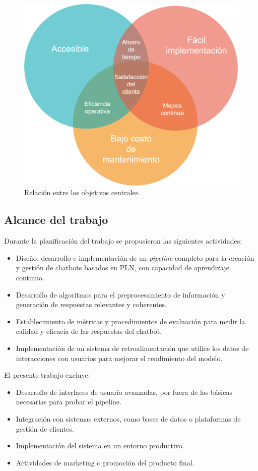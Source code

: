 \begin{figure}[htbp]

  \centering
  \includegraphics[width=.75\textwidth]{./Figures/Venn_objetivos.png}
  \caption{Relación entre los objetivos centrales.}
  \label{fig:objetivos_venn}
\end{figure}

\subsection{Alcance del trabajo}

Durante la planificación del trabajo se propusieron las siguientes actividades:

\begin{itemize}
    \item Diseño, desarrollo e implementación de un \textit{pipeline} completo para la creación y gestión de chatbots basados en PLN, con capacidad de aprendizaje continuo.
    \item Desarrollo de algoritmos para el preprocesamiento de información y generación de respuestas relevantes y coherentes.
    \item Establecimiento de métricas y procedimientos de evaluación para medir la calidad y eficacia de las respuestas del chatbot.
    \item Implementación de un sistema de retroalimentación que utilice los datos de interacciones con usuarios para mejorar el rendimiento del modelo.
\end{itemize}

\vspace{0.5cm} %

El presente trabajo excluye: 
\begin{itemize}
    \item Desarrollo de interfaces de usuario avanzadas, por fuera de las básicas necesarias para probar el pipeline.
    \item Integración con sistemas externos, como bases de datos o plataformas de gestión de clientes.
    \item Implementación del sistema en un entorno productivo.
    \item Actividades de marketing o promoción del producto final.
\end{itemize}


